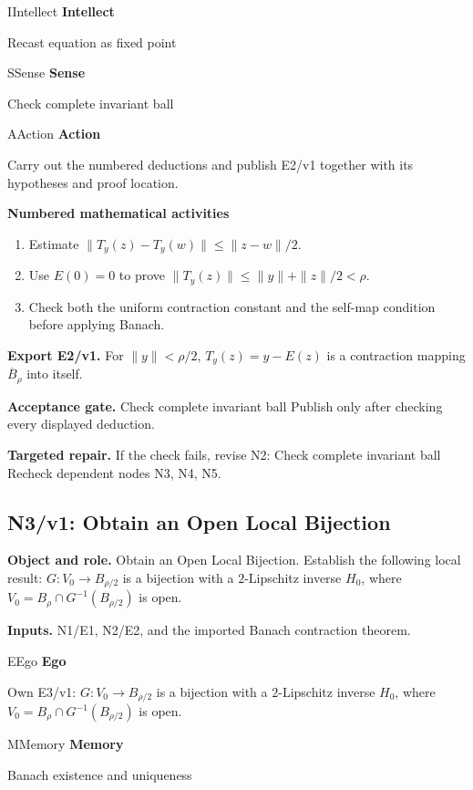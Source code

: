 \documentclass[preprint,12pt,aps,pra,showkeys,amsmath,amssymb,superscriptaddress,floatfix]{revtex4-2}
\theoremstyle{definition}
\theoremstyle{remark}
\newcommand{\mmfaculty}[3]{%
 \begin{mmfacultybox}{#1}{#2}
 {\sffamily\bfseries\color{MMBlue}#2}\par\smallskip #3
 \end{mmfacultybox}}
\newcommand{\field}[2]{\par\smallskip\noindent\textbf{#1.} #2\par}
\begin{document}
\mmfaculty{I}{Intellect}{Recast equation as fixed point}

\mmfaculty{S}{Sense}{Check complete invariant ball}

\mmfaculty{A}{Action}{Carry out the numbered deductions and publish E2/v1 together with its
hypotheses and proof location.}

\smallskip\noindent\textbf{Numbered mathematical activities}

\begin{enumerate}[label=N2.\arabic*,leftmargin=3.4em]

\item Estimate \(\|T_y(z)-T_y(w)\|\le\|z-w\|/2\).

\item Use \(E(0)=0\) to prove \(\|T_y(z)\|\le\|y\|+\|z\|/2<\rho\).

\item Check both the uniform contraction constant and the self-map condition
before applying Banach.

\end{enumerate}

\field{Export E2/v1}{For \(\|y\|<\rho/2\), \(T_y(z)=y-E(z)\) is a contraction mapping
\(\overline B_\rho\) into itself.}

\field{Acceptance gate}{Check complete invariant ball Publish only after checking every
displayed deduction.}

\field{Targeted repair}{If the check fails, revise N2: Check complete invariant ball Recheck
dependent nodes N3, N4, N5.}

\clearpage

\subsection{N3/v1: Obtain an Open Local Bijection}

\field{Object and role}{Obtain an Open Local Bijection. Establish the following local result:
\(G:V_0\to B_{\rho/2}\) is a bijection with a \(2\)-Lipschitz inverse
\(H_0\), where \(V_0=B_\rho\cap G^{-1}(B_{\rho/2})\) is open.}

\field{Inputs}{N1/E1, N2/E2, and the imported Banach contraction theorem.}

\mmfaculty{E}{Ego}{Own E3/v1: \(G:V_0\to B_{\rho/2}\) is a bijection with a \(2\)-Lipschitz
inverse \(H_0\), where \(V_0=B_\rho\cap G^{-1}(B_{\rho/2})\) is open.}

\mmfaculty{M}{Memory}{Banach existence and uniqueness}
\end{document}
